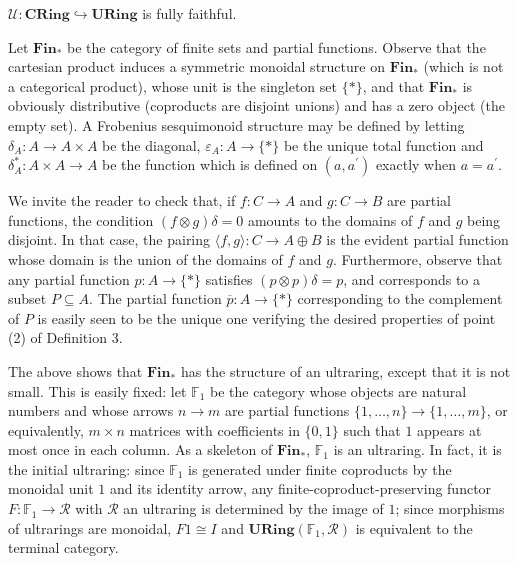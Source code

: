 \documentclass[10pt,a4paper]{amsart}
\begin{document}
 
$\mathcal{U}:\mathbf{CRing}\hookrightarrow\mathbf{URing}$ is fully faithful.\par
 
 
 
 
Let $\mathbf{Fin}_{\ast}$ be the category of finite sets and partial functions. Observe that the cartesian product induces a symmetric monoidal structure on $\mathbf{Fin}_{\ast}$ (which is not a categorical product), whose unit is the singleton set $\{\ast\}$, and that $\mathbf{Fin}_{\ast}$ is obviously distributive (coproducts are disjoint unions) and has a zero object (the empty set). A Frobenius sesquimonoid structure may be defined by letting $\delta_{A}:A\to A\times A$ be the diagonal, $\varepsilon_{A}:A\to\{\ast\}$ be the unique total function and $\delta^{\ast}_{A}:A\times A\to A$ be the function which is defined on $(a,a^{\prime})$ exactly when $a=a^{\prime}$.\par
 
 
 
We invite the reader to check that, if $f:C\to A$ and $g:C\to B$ are partial functions, the condition $(f\otimes g)\delta=0$ amounts to the domains of $f$ and $g$ being disjoint. In that case, the pairing $\langle f,g\rangle:C\to A\oplus B$ is the evident partial function whose domain is the union of the domains of $f$ and $g$. Furthermore, observe that any partial function $p:A\to\{\ast\}$ satisfies $(p\otimes p)\delta=p$, and corresponds to a subset $P\subseteq A$. The partial function $\overline{p}:A\to\{\ast\}$ corresponding to the complement of $P$ is easily seen to be the unique one verifying the desired properties of point (2) of Definition 3.\par
 
 
 
The above shows that $\mathbf{Fin}_{\ast}$ has the structure of an ultraring, except that it is not small. This is easily fixed: let $\mathbb{F}_{1}$ be the category whose objects are natural numbers and whose arrows $n\to m$ are partial functions $\{1,\ldots,n\}\to\{1,\ldots,m\}$, or equivalently, $m\times n$ matrices with coefficients in $\{0,1\}$ such that $1$ appears at most once in each column. As a skeleton of $\mathbf{Fin}_{\ast}$, $\mathbb{F}_{1}$ is an ultraring. In fact, it is the initial ultraring: since $\mathbb{F}_{1}$ is generated under finite coproducts by the monoidal unit $1$ and its identity arrow, any finite-coproduct-preserving functor $F:\mathbb{F}_{1}\to\mathcal{R}$ with $\mathcal{R}$ an ultraring is determined by the image of $1$; since morphisms of ultrarings are monoidal, $F1\cong I$ and $\mathbf{URing}(\mathbb{F}_{1},\mathcal{R})$ is equivalent to the terminal category.\par
 
\end{document}
